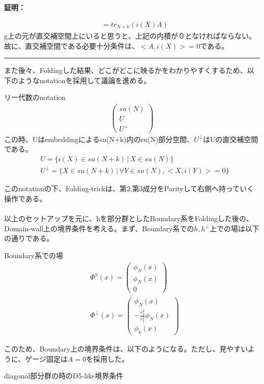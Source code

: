 \documentclass[dvipdfmx,a4paper,10.5pt]{article}
\numberwithin{equation}{section}
\newenvironment{proofbox}
{\begin{prooflabel}\textbf{証明：}\end{prooflabel}\vspace{0.8em}}
{\par\vspace{1em}\hrule\vspace{1em}}
\begin{document}
\begin{enumerate}
\begin{proofbox}
\begin{align*}
    &=tr_{N+k}(i(X)A)
\end{align*}
g上の元が直交補空間上にいると思うと、上記の内積が０となければならない。\\
故に、直交補空間である必要十分条件は、$<A,i(X)>=0$である。
\end{proofbox}
また後々、Foldingした結果、どこがどこに映るかをわかりやすくするため、以下のようなnotationを採用して議論を進める。
\begin{defbox}{リー代数のnotation}
    \begin{align*}
        \begin{pmatrix}
           su(N) \\ U \\ U^{\perp}
        \end{pmatrix}
    \end{align*}
    この時、Uはembeddingによるsu(N+k)内のsu(N)部分空間、$U^{\perp}$はUの直交補空間である。
    \begin{align*}
        &U=\{i(X)\in su(N+k)\,|\,X\in su(N)\}\\
        &U^{\perp}=\{X\in su(N+k)\,|\,\forall Y\in su(N),<X,i(Y)>=0 \}
    \end{align*}
\end{defbox}
このnotationの下、Folding-trickは、第2,第3成分をParityして右側へ持っていく操作である。\\
\\
以上のセットアップを元に、hを部分群としたBoundary系をFoldingした後の、Domain-wall上の境界条件を考える。まず、Boundary系での$h,h^{\perp}$上での場は以下の通りである。
\begin{resultbox}{Boundary系での場}
    \begin{align*}
    &\Phi^{h}(x)=\begin{pmatrix}
        \phi_{N}(x)\\ \phi_{N}(x) \\ 0
    \end{pmatrix}\\
    &\Phi^{\perp}(x)=\begin{pmatrix}
        \phi_{N}(x)\\ -\frac{e^{2}_{2}}{e^{2}_{1}}\phi_{N}(x) \\ \phi_{k}(x)
    \end{pmatrix}
\end{align*}
\end{resultbox}
このため、Boundary上の境界条件は、以下のようになる。ただし、見やすいように、ゲージ固定は$A=0$を採用した。
\begin{resultbox}{diagonal部分群の時のD5-like境界条件}

\end{resultbox}
\end{enumerate}
\end{document}
